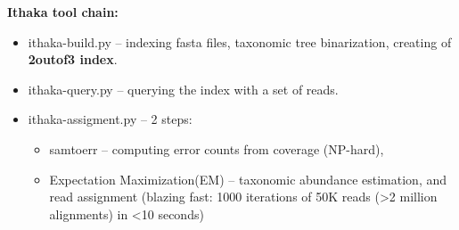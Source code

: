 \documentclass[portrait,final,a0paper,fontscale=0.277]{baposter}
\begin{document}
\begin{poster}
{%
%
\hspace{-1em}
\begin{minipage}{0.46\textwidth}
{\bf Ithaka tool chain:}
\vspace{-0.7em}
\begin{itemize}[leftmargin=*]
\setlength\itemsep{-0.2em}
\item ithaka-build.py -- indexing fasta files, taxonomic tree binarization, creating of {\bf 2outof3 index}.
\item ithaka-query.py -- querying the index with a set of reads. 
\item ithaka-assigment.py -- 2 steps:
\vspace{-1em}
\begin{itemize}[leftmargin=0.5em]
\setlength\itemsep{-0.2em}
\item samtoerr -- computing error counts from coverage (NP-hard), 
\item Expectation Maximization(EM) -- taxonomic abundance estimation, and read assignment (blazing fast: 1000 iterations of 50K reads (>2 million alignments) in <10 seconds)
\end{itemize}
\end{itemize}
\vspace{-0.7em}
%

\end{minipage}}
\end{poster}
\end{document}
